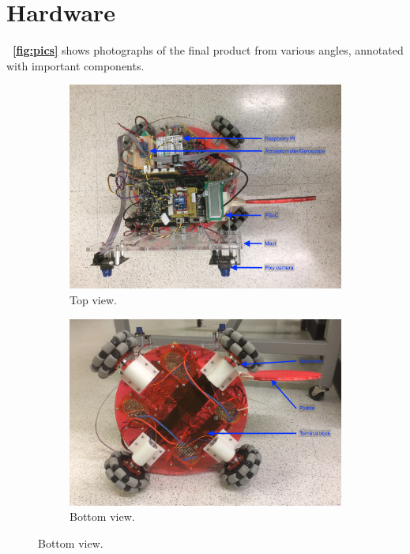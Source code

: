 \documentclass[letterpaper, 11pt]{article}
\newcommand*{\figref}[1]{\textbf{\figurename~\ref{#1}}}
\begin{document}
\section{Hardware}
\figref{fig:pics} shows photographs of the final product from various angles, annotated with important components.
\begin{figure}[H]
    \centering
    \begin{subfigure}[t]{0.8\textwidth}
        \includegraphics[width=\textwidth]{images/top.JPG}
        \caption{Top view.}
    \end{subfigure}

    \begin{subfigure}[t]{0.8\textwidth}
        \includegraphics[width=\textwidth]{images/bottom.JPG}
        \caption{Bottom view.}
    \end{subfigure}
\end{figure}
\end{document}
